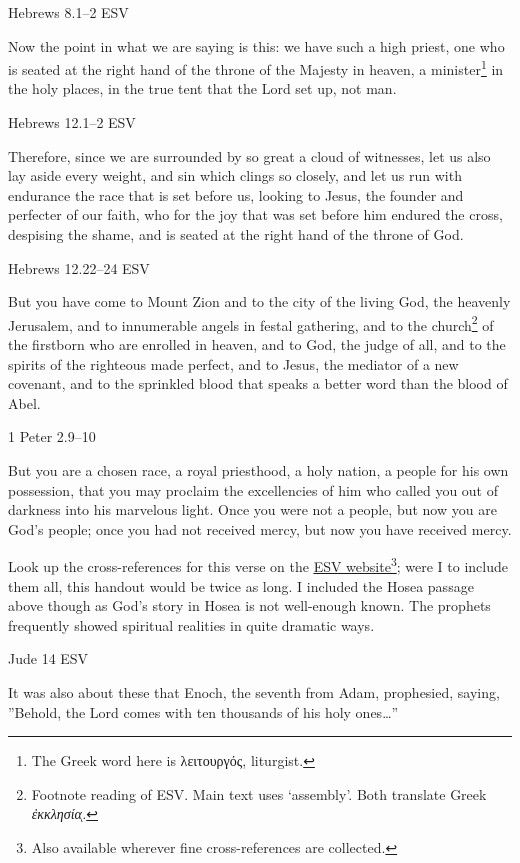 \documentclass[
]{article}
\newcommand{\RL}[1]{\beginR #1\endR}
\begin{document}
Hebrews 8.1--2 ESV

Now the point in what we are saying is this: we have such a high priest,
one who is seated at the right hand of the throne of the Majesty in
heaven, a minister\footnote{The Greek word here is λειτουργός,
  liturgist.} in the holy places, in the true tent that the Lord set up,
not man.

Hebrews 12.1--2 ESV

Therefore, since we are surrounded by so great a cloud of witnesses, let
us also lay aside every weight, and sin which clings so closely, and let
us run with endurance the race that is set before us, looking to Jesus,
the founder and perfecter of our faith, who for the joy that was set
before him endured the cross, despising the shame, and is seated at the
right hand of the throne of God.

Hebrews 12.22--24 ESV

But you have come to Mount Zion and to the city of the living God, the
heavenly Jerusalem, and to innumerable angels in festal gathering, and
to the church\footnote{Footnote reading of ESV. Main text uses
  `assembly'. Both translate Greek \emph{ἐκκλησία}ͅ\emph{.}} of the
firstborn who are enrolled in heaven, and to God, the judge of all, and
to the spirits of the righteous made perfect, and to Jesus, the mediator
of a new covenant, and to the sprinkled blood that speaks a better word
than the blood of Abel.

1 Peter 2.9--10

But you are a chosen race, a royal priesthood, a holy nation, a people
for his own possession, that you may proclaim the excellencies of him
who called you out of darkness into his marvelous light. Once you were
not a people, but now you are God\RL{'}s people; once you had not
received mercy, but now you have received mercy.

Look up the cross-references for this verse on the
\href{https://www.esv.org/1+Peter+2/}{\ul{ESV website}}\footnote{Also
  available wherever fine cross-references are collected.}; were I to
include them all, this handout would be twice as long. I included the
Hosea passage above though as God's story in Hosea is not well-enough
known. The prophets frequently showed spiritual realities in quite
dramatic ways.

Jude 14 ESV

It was also about these that Enoch, the seventh from Adam, prophesied,
saying, \RL{''}Behold, the Lord comes with ten thousands of his holy
ones\ldots''
\end{document}
